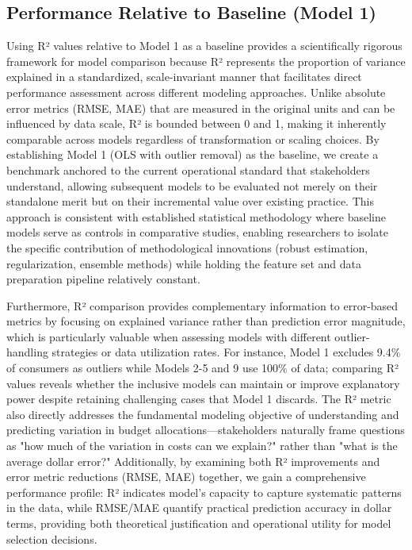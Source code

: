 
\subsection{Performance Relative to Baseline (Model 1)}

Using R² values relative to Model 1 as a baseline provides a scientifically rigorous framework for model comparison because R² represents the proportion of variance explained in a standardized, scale-invariant manner that facilitates direct performance assessment across different modeling approaches. Unlike absolute error metrics (RMSE, MAE) that are measured in the original units and can be influenced by data scale, R² is bounded between 0 and 1, making it inherently comparable across models regardless of transformation or scaling choices. By establishing Model 1 (OLS with outlier removal) as the baseline, we create a benchmark anchored to the current operational standard that stakeholders understand, allowing subsequent models to be evaluated not merely on their standalone merit but on their incremental value over existing practice. This approach is consistent with established statistical methodology where baseline models serve as controls in comparative studies, enabling researchers to isolate the specific contribution of methodological innovations (robust estimation, regularization, ensemble methods) while holding the feature set and data preparation pipeline relatively constant.

Furthermore, R² comparison provides complementary information to error-based metrics by focusing on explained variance rather than prediction error magnitude, which is particularly valuable when assessing models with different outlier-handling strategies or data utilization rates. For instance, Model 1 excludes 9.4\% of consumers as outliers while Models 2-5 and 9 use 100\% of data; comparing R² values reveals whether the inclusive models can maintain or improve explanatory power despite retaining challenging cases that Model 1 discards. The R² metric also directly addresses the fundamental modeling objective of understanding and predicting variation in budget allocations—stakeholders naturally frame questions as "how much of the variation in costs can we explain?" rather than "what is the average dollar error?" Additionally, by examining both R² improvements and error metric reductions (RMSE, MAE) together, we gain a comprehensive performance profile: R² indicates model's capacity to capture systematic patterns in the data, while RMSE/MAE quantify practical prediction accuracy in dollar terms, providing both theoretical justification and operational utility for model selection decisions.

